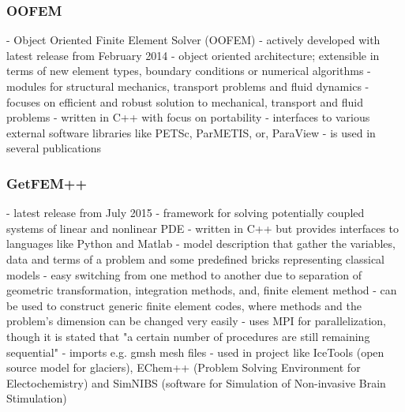   \subsubsection{OOFEM}\cite{oofem}
  - Object Oriented Finite Element Solver (OOFEM) 
  - actively developed with latest release from February 2014\newline
  - object oriented architecture; extensible in terms of new element types, boundary conditions or numerical algorithms\newline
  - modules for structural mechanics, transport problems and fluid dynamics\newline
  - focuses on efficient and robust solution to mechanical, transport and fluid problems\newline
  - written in C++ with focus on portability\newline
  - interfaces to various external software libraries like PETSc, ParMETIS, or, ParaView\newline
  - is used in several publications \cite{oofemPubs}
  \subsubsection{GetFEM++}
  - latest release from July 2015
  - framework for solving potentially coupled systems of linear and nonlinear PDE\newline
  - written in C++ but provides interfaces to languages like Python and Matlab\newline
  - model description that gather the variables, data and terms of a problem and some predefined bricks representing classical models\newline
  - easy switching from one method to another due to separation of geometric transformation, integration methods, and, finite element method\newline
  - can be used to construct generic finite element codes, where methods and the problem's dimension can be changed very easily\newline
  - uses MPI for parallelization, though it is stated that "a certain number of procedures are still remaining sequential" \cite{getfemppMPI}
  - imports e.g. gmsh mesh files\newline
  - used in project like IceTools \cite{icetools} (open source model for glaciers), EChem++ \cite{echempp} (Problem Solving Environment for Electochemistry) and SimNIBS \cite{simnibs} (software for Simulation of Non-invasive Brain Stimulation)
